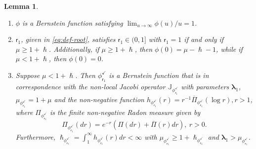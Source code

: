 \documentclass[10pt]{amsart}
\theoremstyle{plain}
\newtheorem{lemma}[theorem]{Lemma}
\theoremstyle{definition}
\newcommand{\calJ}{\mathds{J}}
\newcommand{\lam}{{\bm{\lambda}_1}}
\newcommand{\vat}{{\mathsf{r}_1}}
\renewcommand{\varphi}{{\phi_{\vat}^{\checkmark}}}
\let\h\hslash
\let\mo\mu
\begin{document}
\skpt
\begin{lemma}
\label{lem:phi-Psi1-claims}
\begin{enumerate}
\item \label{item-0:lem:phi-Psi1-claims} $\phi$ is a Bernstein function satisfying $\lim_{u\to\infty} \phi(u)/u =1$.
\item \label{item-1:lem:phi-Psi1-claims}
$\vat$, given in \eqref{eq:def-root}, satisfies $\vat \in (0,1]$ with $\vat = 1$ if and only if $\mo \geq 1+\h$. Additionally, if $\mo \geq 1+\h$, then $\phi(0) = \mo-\h - 1$, while if $\mo < 1+\h$, then $\phi(0) = 0$.

\item \label{item-2:lem:phi-Psi1-claims}
Suppose $\mo < 1+\h$. Then $\varphi$ is a Bernstein function that is in correspondence with the non-local Jacobi operator $\calJ_\varphi$ with parameters $\lam$, $\mo_\varphi = 1+\mo$ and the non-negative function $h_\varphi(r)=r^{-1}\overline{\Pi}_\varphi(\log r), r>1$, where $\Pi_\varphi$ is the finite non-negative Radon measure given by
\begin{equation*}
\Pi_\varphi(dr) = e^{-r}\left(\Pi(dr)+\overline{\Pi}(r)dr\right), \ r > 0.
\end{equation*}
Furthermore, $\h_\varphi = \int_1^\infty h_\varphi(r)dr < \infty$ with $\mo_\varphi \geq 1+\h_\varphi$ and $\lam > \mo_\varphi$.
\end{enumerate}
\end{lemma}
\end{document}

